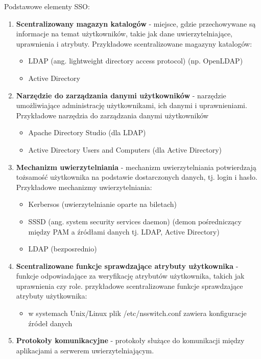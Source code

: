 \documentclass{article}
\begin{document}
Podstawowe elementy SSO:
\begin{enumerate}
    \item \textbf{Scentralizowany magazyn katalogów} - miejsce, gdzie przechowywane są informacje na temat użytkowników, takie jak dane uwierzytelniające, uprawnienia i atrybuty. Przykładowe scentralizowane magazyny katalogów:
    \begin{itemize}
        \item LDAP (ang. lightweight directory access protocol) (np. OpenLDAP)
        \item Active Directory
    \end{itemize}
    \item \textbf{Narzędzie do zarządzania danymi użytkowników} - narzędzie umożliwiające administrację użytkownikami, ich danymi i uprawnieniami. Przykładowe narzędzia do zarządzania danymi użytkowników
    \begin{itemize}
        \item Apache Directory Studio (dla LDAP)
        \item Active Directory Users and Computers (dla Active Directory)
    \end{itemize}
    \item \textbf{Mechanizm uwierzytelniania} - mechanizm uwierzytelniania potwierdzają tożsamość użytkownika na podstawie dostarczonych danych, tj. login i hasło. Przykładowe mechanizmy uwierzytelniania:
    \begin{itemize}
        \item Kerbersos (uwierzytelnianie oparte na biletach)
        \item SSSD (ang. system security services daemon) (demon pośredniczący między PAM a źródłami danych tj. LDAP, Active Directory)
        \item LDAP (bezposrednio)
    \end{itemize}
    \item \textbf{Scentralizowane funkcje sprawdzające atrybuty użytkownika} - funkcje odpowiadające za weryfikację atrybutów użytkownika, takich jak uprawnienia czy role. przykładowe scentralizowane funkcje sprawdzające atrybuty użytkownika:
    \begin{itemize}
        \item w systemach Unix/Linux plik /etc/nsswitch.conf zawiera konfiguracje źródeł danych
    \end{itemize}
    \item \textbf{Protokoły komunikacyjne} - protokoły służące do komunikacji między aplikacjami a serwerem uwierzytelniającym.
\end{enumerate}
\end{document}
